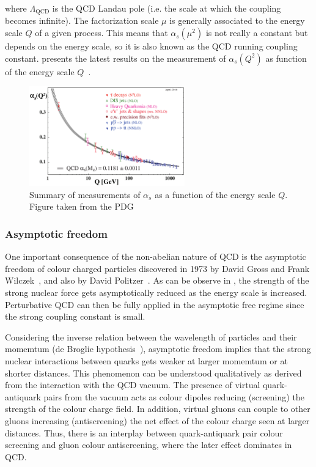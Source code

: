 where $\Lambda_{\mathrm{QCD}}$ is the QCD Landau pole (i.e. the scale at which the coupling becomes infinite). The factorization scale $\mu$ is generally associated to the energy scale $Q$ of a given process. This means that $\alpha_{s}\left(\mu^{2}\right)$ is not really a constant but depends on the energy scale, so it is also known as the QCD running coupling constant.  presents the latest results on the measurement of $\alpha_{s}\left(Q^{2}\right)$ as function of the energy scale $Q$~\cite{PDG}.

\begin{figure}[htbp]
 \begin{center}
  \includegraphics[width=0.6\textwidth]{Figures/Introduction/StandardModel/Alphas.png}
 \end{center}
\caption{Summary of measurements of $\alpha_{s}$ as a function of the energy scale $Q$. Figure taken from the PDG~\cite{PDG}}
 \label{fig:Alphas}
\end{figure}

\subsubsection{Asymptotic freedom}

One important consequence of the non-abelian nature of QCD is the asymptotic freedom of colour charged particles discovered in 1973 by David Gross and Frank Wilczek~\cite{AsymptoticFreedom_1}, and also by David Politzer~\cite{AsymptoticFreedom_2}. As can be observe in , the strength of the strong nuclear force gets asymptotically reduced as the energy scale is increased. Perturbative QCD can then be fully applied in the asymptotic free regime since the strong coupling constant is small.

Considering the inverse relation between the wavelength of particles and their momemtum (de Broglie hypothesis~\cite{Broglie}), asymptotic freedom implies that the strong nuclear interactions between quarks gets weaker at larger momemtum or at shorter distances. This phenomenon can be understood qualitatively as derived from the interaction with the QCD vacuum. The presence of virtual quark-antiquark pairs from the vacuum acts as colour dipoles reducing (screening) the strength of the colour charge field. In addition, virtual gluons can couple to other gluons increasing (antiscreening) the net effect of the colour charge seen at larger distances. Thus, there is an interplay between quark-antiquark pair colour screening and gluon colour antiscreening, where the later effect dominates in QCD.

